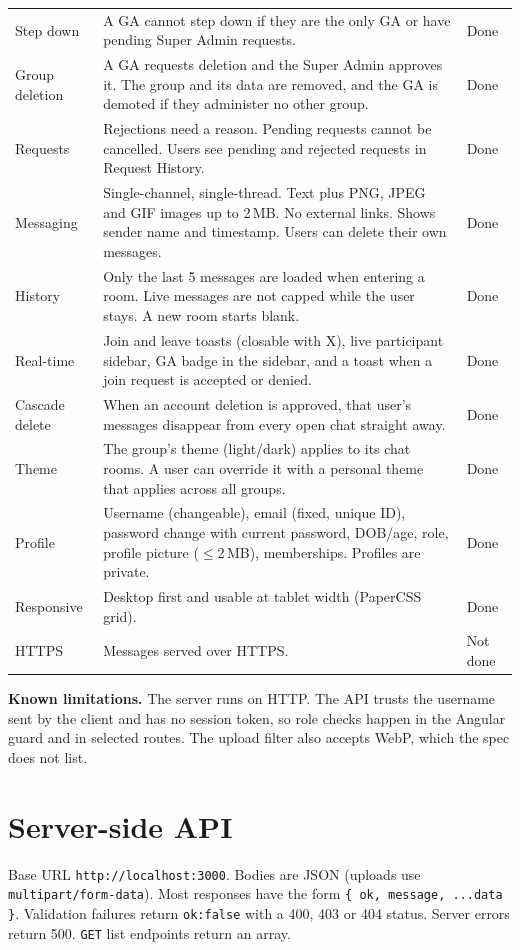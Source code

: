 \documentclass[10pt,a4paper]{article}
\newcommand{\ep}[1]{\texttt{\small #1}}
\begin{document}
\begin{longtable}{L{2.6cm} L{11.2cm} L{1.9cm}}
Step down & A GA cannot step down if they are the only GA or have pending Super Admin requests. & Done\\
Group deletion & A GA requests deletion and the Super Admin approves it. The group and its data are removed, and the GA is demoted if they administer no other group. & Done\\
Requests & Rejections need a reason. Pending requests cannot be cancelled. Users see pending and rejected requests in Request History. & Done\\
Messaging & Single-channel, single-thread. Text plus PNG, JPEG and GIF images up to 2\,MB. No external links. Shows sender name and timestamp. Users can delete their own messages. & Done\\
History & Only the last 5 messages are loaded when entering a room. Live messages are not capped while the user stays. A new room starts blank. & Done\\
Real-time & Join and leave toasts (closable with X), live participant sidebar, GA badge in the sidebar, and a toast when a join request is accepted or denied. & Done\\
Cascade delete & When an account deletion is approved, that user's messages disappear from every open chat straight away. & Done\\
Theme & The group's theme (light/dark) applies to its chat rooms. A user can override it with a personal theme that applies across all groups. & Done\\
Profile & Username (changeable), email (fixed, unique ID), password change with current password, DOB/age, role, profile picture ($\le$2\,MB), memberships. Profiles are private. & Done\\
Responsive & Desktop first and usable at tablet width (PaperCSS grid). & Done\\
HTTPS & Messages served over HTTPS. & Not done\\
\bottomrule
\end{longtable}

\textbf{Known limitations.} The server runs on HTTP. The API trusts the username sent by the client and has no session token, so role checks happen in the Angular guard and in selected routes. The upload filter also accepts WebP, which the spec does not list.

\section{Server-side API}
Base URL \ep{http://localhost:3000}. Bodies are JSON (uploads use \ep{multipart/form-data}). Most responses have the form \ep{\{ ok, message, ...data \}}. Validation failures return \ep{ok:false} with a 400, 403 or 404 status. Server errors return 500. \ep{GET} list endpoints return an array.
\end{document}
